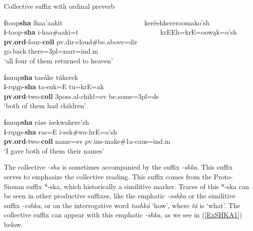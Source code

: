\begin{exe}
\item\label{ExSHA2} Collective suffix with ordinal preverb

	\begin{xlist}
	
	\item \glll \textbf{í}toop\textbf{sha} íhaa'aakit ~ ~ ~ ~ ~ ~ ~ ~ ~ ~ ~ ~ ~ ~ keréehkereroomako'sh\\
	\textbf{i}-toop-\textbf{sha} i-haa\#aaki=t ~ ~ ~ ~ ~ ~ ~ ~ ~ ~ ~ ~ ~ ~  krEEh=krE=oowąk=o'sh\\
	\textbf{pv.ord}-\textnormal{four}-\textbf{coll} pv.dir-\textnormal{cloud}\#\textnormal{be.above}=dir ~ ~ ~ ~ ~ ~ ~ ~ ~ ~ ~ ~ ~ ~ \textnormal{go.back.there}=3pl=narr=ind.m\\
	\glt `all four of them returned to heaven' \citep[175]{hollow1973a}
	
	\item \glll \textbf{í}nuup\textbf{sha} tasúke túkerek\\
	\textbf{i}-rųųp-\textbf{sha} ta-suk=E tu=krE=ak\\
	\textbf{pv.ord}-\textnormal{two}-\textbf{coll} 3poss.al-\textnormal{child}=sv \textnormal{be.some}=3pl=ds\\
	\glt `both of them had children' \citep[111]{hollow1973a}
	
	\item \glll \textbf{í}nuup\textbf{sha} ráse ísekwahere'sh\\
	\textbf{i}-rųųp-\textbf{sha} ras=E i-sek\#wa-hrE=o'sh\\
	\textbf{pv.ord}-\textnormal{two}-\textbf{coll} \textnormal{name}=sv pv.ins-\textnormal{make}\#1a-caus=ind.m\\
	\glt `I gave both of them their names' \citep[64]{hollow1973a} 
	
	\end{xlist}

\end{exe}

The collective \textit{-sha} is sometimes accompanied by the suffix \textit{-shka}. This suffix serves to emphasize the collective reading. This suffix comes from the Proto-Siouan suffix *-ska, which historically a similitive marker. Traces of this *-ska can be seen in other productive suffixes, like the emphatic \textit{-oshka} or the similitive suffix \textit{-eshka}, or on the interrogative word \textit{tashká} `how', where \textit{tá} is `what'. The collective suffix can appear with this emphatic \textit{-shka}, as we see in (\ref{ExSHKA1}) below.

